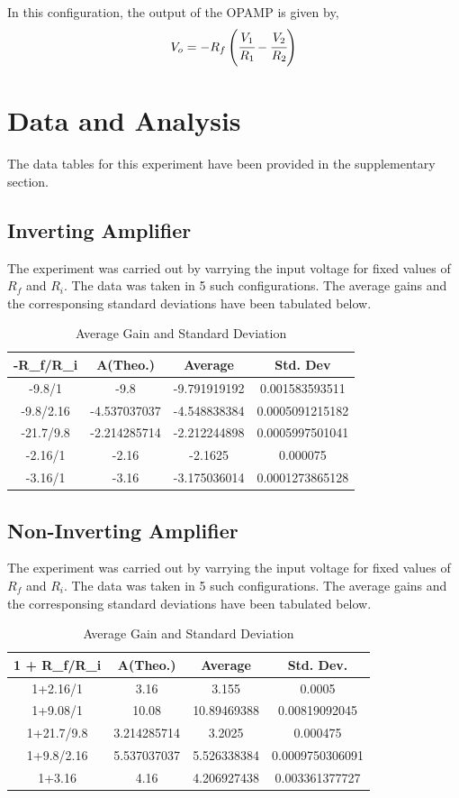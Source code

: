 \documentclass[10pt]{scrartcl}
\theoremstyle{definition}
\begin{document}
In this configuration, the output of the OPAMP is given by, 
$$V_o = -R_f\left(\cfrac{V_1}{R_1} - \cfrac{V_2}{R_2}\right)$$
\pagebreak
\section{Data and Analysis}
The data tables for this experiment have been provided in the supplementary section.
\subsection{Inverting Amplifier}
The experiment was carried out by varrying the input voltage for fixed values of $R_f$ and $R_i$.
The data was taken in 5 such configurations. The average gains and the corresponsing standard deviations
have been tabulated below.

\begin{table}[!h]
    \centering
    \begin{tabular}{|c|c|c|c|}
    \hline
        \textbf{-R\_f/R\_i} & \textbf{A(Theo.)} & \textbf{Average} & \textbf{Std. Dev} \\ \hline
        -9.8/1 & -9.8 & -9.791919192 & 0.001583593511 \\ \hline
        -9.8/2.16 & -4.537037037 & -4.548838384 & 0.0005091215182 \\ \hline
        -21.7/9.8 & -2.214285714 & -2.212244898 & 0.0005997501041 \\ \hline
        -2.16/1 & -2.16 & -2.1625 & 0.000075 \\ \hline
        -3.16/1 & -3.16 & -3.175036014 & 0.0001273865128 \\ \hline
    \end{tabular}
    \caption{Average Gain and Standard Deviation}
\end{table}
\subsection{Non-Inverting Amplifier}
The experiment was carried out by varrying the input voltage for fixed values of $R_f$ and $R_i$.
The data was taken in 5 such configurations. The average gains and the corresponsing standard deviations
have been tabulated below.

\begin{table}[!h]
    \centering
    \begin{tabular}{|c|c|c|c|}
    \hline
        \textbf{1 + R\_f/R\_i} & \textbf{A(Theo.)} & \textbf{Average} & \textbf{Std. Dev.} \\ \hline
        1+2.16/1 & 3.16 & 3.155 & 0.0005 \\ \hline
        1+9.08/1 & 10.08 & 10.89469388 & 0.00819092045 \\ \hline
        1+21.7/9.8 & 3.214285714 & 3.2025 & 0.000475 \\ \hline
        1+9.8/2.16 & 5.537037037 & 5.526338384 & 0.0009750306091 \\ \hline
        1+3.16 & 4.16 & 4.206927438 & 0.003361377727 \\ \hline
    \end{tabular}
    \caption{Average Gain and Standard Deviation}
\end{table}
\clearpage
\end{document}
